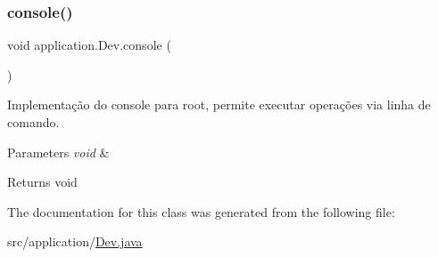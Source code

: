 \subsubsection{\texorpdfstring{console()}{console()}}
{\footnotesize\ttfamily void application.\+Dev.\+console (\begin{DoxyParamCaption}{ }\end{DoxyParamCaption})}



Implementação do console para root, permite executar operações via linha de comando. 


\begin{DoxyParams}{Parameters}
{\em void} & \\
\hline
\end{DoxyParams}
\begin{DoxyReturn}{Returns}
void 
\end{DoxyReturn}


The documentation for this class was generated from the following file\+:\begin{DoxyCompactItemize}
\item 
src/application/\mbox{\hyperlink{_dev_8java}{Dev.\+java}}\end{DoxyCompactItemize}

